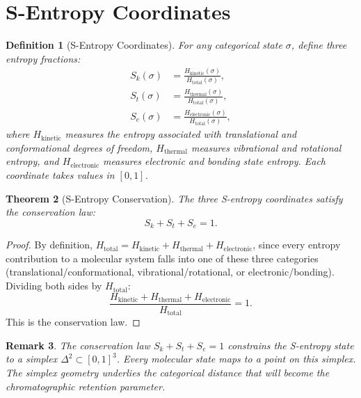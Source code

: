 \documentclass[11pt,twocolumn,a4paper]{article}
\newtheorem{theorem}{Theorem}[section]
\newtheorem{definition}[theorem]{Definition}
\newtheorem{remark}[theorem]{Remark}
\newcommand{\Sk}{S_k}
\newcommand{\St}{S_t}
\newcommand{\Se}{S_e}
\begin{document}
\section{S-Entropy Coordinates}
\label{sec:s-entropy}

\begin{definition}[S-Entropy Coordinates]
\label{def:s-entropy-coords}
For any categorical state $\sigma$, define three entropy fractions:
\begin{align}
\Sk(\sigma) &= \frac{H_{\mathrm{kinetic}}(\sigma)}{H_{\mathrm{total}}(\sigma)}, \label{eq:sk} \\
\St(\sigma) &= \frac{H_{\mathrm{thermal}}(\sigma)}{H_{\mathrm{total}}(\sigma)}, \label{eq:st} \\
\Se(\sigma) &= \frac{H_{\mathrm{electronic}}(\sigma)}{H_{\mathrm{total}}(\sigma)}, \label{eq:se}
\end{align}
where $H_{\mathrm{kinetic}}$ measures the entropy associated with
translational and conformational degrees of freedom,
$H_{\mathrm{thermal}}$ measures vibrational and rotational entropy,
and $H_{\mathrm{electronic}}$ measures electronic and bonding state
entropy. Each coordinate takes values in $[0,1]$.
\end{definition}

\begin{theorem}[S-Entropy Conservation]
\label{thm:s-entropy-conservation}
The three S-entropy coordinates satisfy the conservation law:
\begin{equation}
\Sk + \St + \Se = 1.
\label{eq:s-conservation}
\end{equation}
\end{theorem}

\begin{proof}
By definition, $H_{\mathrm{total}} = H_{\mathrm{kinetic}} +
H_{\mathrm{thermal}} + H_{\mathrm{electronic}}$, since every entropy
contribution to a molecular system falls into one of these three
categories (translational/conformational, vibrational/rotational, or
electronic/bonding). Dividing both sides by $H_{\mathrm{total}}$:
\begin{equation}
\frac{H_{\mathrm{kinetic}} + H_{\mathrm{thermal}} + H_{\mathrm{electronic}}}{H_{\mathrm{total}}} = 1.
\end{equation}
This is the conservation law.
\end{proof}

\begin{remark}
The conservation law $\Sk + \St + \Se = 1$ constrains the S-entropy
state to a simplex $\Delta^2 \subset [0,1]^3$. Every molecular state
maps to a point on this simplex. The simplex geometry underlies the
categorical distance that will become the chromatographic retention
parameter.
\end{remark}
\end{document}
